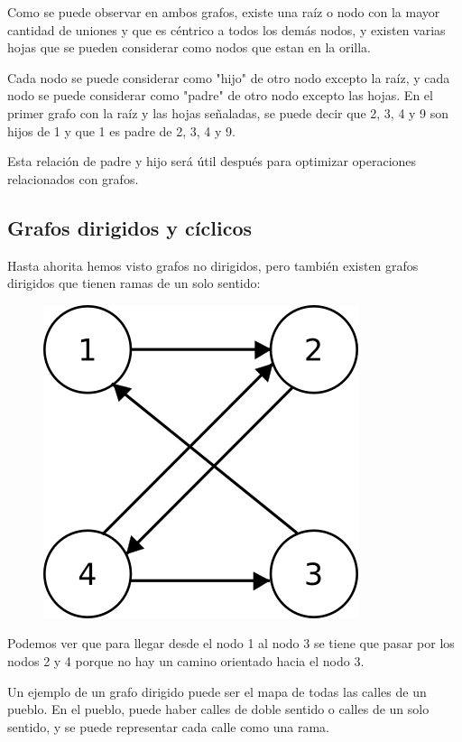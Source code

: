 \documentclass{article}
\begin{document}
Como se puede observar en ambos grafos, existe una raíz o nodo con la mayor cantidad de uniones y que es céntrico a todos los demás nodos, y existen varias hojas que se pueden considerar como nodos que estan en la orilla.

Cada nodo se puede considerar como "hijo" de otro nodo excepto la raíz, y cada nodo se puede considerar como "padre" de otro nodo excepto las hojas. En el primer grafo con la raíz y las hojas señaladas, se puede decir que 2, 3, 4 y 9 son hijos de 1 y que 1 es padre de 2, 3, 4 y 9.

Esta relación de padre y hijo será útil después para optimizar operaciones relacionados con grafos.

\subsection{Grafos dirigidos y cíclicos}

Hasta ahorita hemos visto grafos no dirigidos, pero también existen grafos dirigidos que tienen ramas de un solo sentido:

\begin{figure}[H]
    \centering
    \includegraphics[width=0.15\paperwidth]{dirigido}
\end{figure}

Podemos ver que para llegar desde el nodo 1 al nodo 3 se tiene que pasar por los nodos 2 y 4 porque no hay un camino orientado hacia el nodo 3.

Un ejemplo de un grafo dirigido puede ser el mapa de todas las calles de un pueblo. En el pueblo, puede haber calles de doble sentido o calles de un solo sentido, y se puede representar cada calle como una rama.
\end{document}
